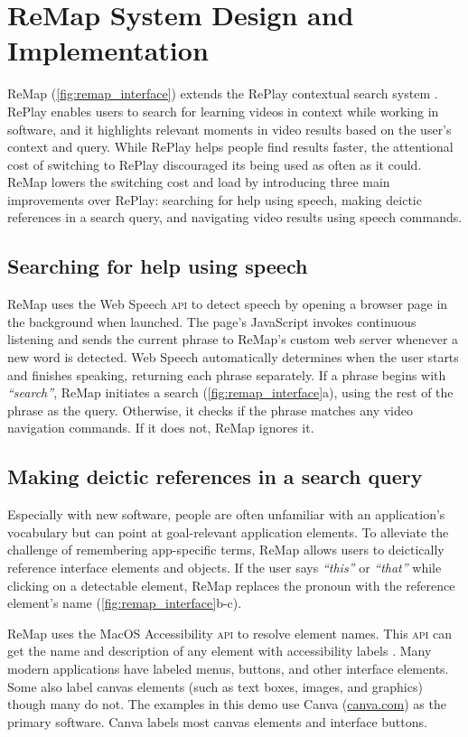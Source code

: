 \section{ReMap System Design and Implementation}
ReMap (\autoref{fig:remap_interface}) extends the RePlay contextual search system \cite{Fraser2019}. RePlay enables users to search for learning videos in context while working in software, and it highlights relevant moments in video results based on the user's context and query. While RePlay helps people find results faster, the attentional cost of switching to RePlay discouraged its being used as often as it could. ReMap lowers the switching cost and load by introducing three main improvements over RePlay: searching for help using speech, making deictic references in a search query, and navigating video results using speech commands.

\subsection{Searching for help using speech}
ReMap uses the Web Speech \textsc{api} to detect speech by opening a browser page in the background when launched. The page's JavaScript invokes continuous listening and sends the current phrase to ReMap's custom web server whenever a new word is detected.
Web Speech automatically determines when the user starts and finishes speaking, returning each phrase separately. If a phrase begins with \textit{``search''}, ReMap initiates a search (\autoref{fig:remap_interface}a), using the rest of the phrase as the query. Otherwise, it checks if the phrase matches any video navigation commands. If it does not, ReMap ignores it.

\subsection{Making deictic references in a search query}
Especially with new software, people are often unfamiliar with an application's vocabulary but can point at goal-relevant application elements. 
To alleviate the challenge of remembering app-specific terms, ReMap allows users to deictically reference interface elements and objects. If the user says \textit{``this''} or \textit{``that''} while clicking on a detectable element, ReMap replaces the pronoun with the reference element's name (\autoref{fig:remap_interface}b-c).

ReMap uses the MacOS Accessibility \textsc{api} to resolve element names. This \textsc{api} can get the name and description of any element with accessibility labels \cite{Fraser2019}. Many modern applications have labeled menus, buttons, and other interface elements. Some also label canvas elements (such as text boxes, images, and graphics) though many do not. The examples in this demo use Canva (\url{canva.com}) as the primary software. Canva labels most canvas elements and interface buttons.


